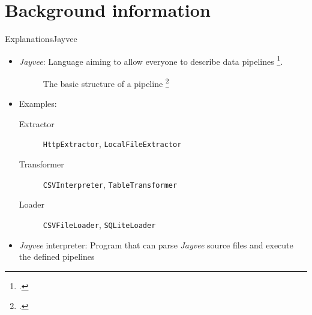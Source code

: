 \section{Background information} %
\begin{frame}[t]{Explanations}{Jayvee}
	\begin{itemize}
		\item \emph{Jayvee}: Language aiming to allow everyone to describe data pipelines \footcite{jvalue:jayvee}.
		      \begin{figure}[h]
			      \begin{center}
				      
			      \end{center}
			      \caption{The basic structure of a pipeline \footcite{jvalue:jayvee:docs:core_concepts}}
		      \end{figure}
		\item<2-> Examples:
		      \begin{description}
			      \item[Extractor] \Verb|HttpExtractor|, \Verb|LocalFileExtractor|
			      \item[Transformer] \Verb|CSVInterpreter|, \Verb|TableTransformer|
			      \item[Loader] \Verb|CSVFileLoader|, \Verb|SQLiteLoader|
		      \end{description}
		\item<3-> \emph{Jayvee} interpreter: Program that can parse \emph{Jayvee} source files and execute the defined pipelines
	\end{itemize}
\end{frame}


